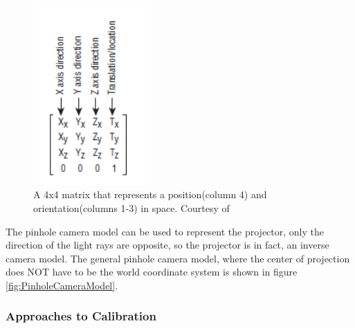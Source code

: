 \documentclass[]{article}
\begin{document}
\begin{figure}[hbtp]
    \centering
    \includegraphics[width=0.4\textwidth]{figures/MVMatrixOGLSB.PNG}
    \caption{A 4x4 matrix that represents a position(column 4) and orientation(columns 1-3) in space. Courtesy of \cite{superbible}}
    \label{fig:MVMatrix}
\end{figure}

The pinhole camera model can be used to represent the projector, only the direction of the light rays are opposite, so the projector is in fact, an inverse camera model. The general pinhole camera model, where the center of projection does NOT have to be the world coordinate system is shown in figure \ref{fig:PinholeCameraModel}.

\subsubsection{Approaches to Calibration}
\end{document}
